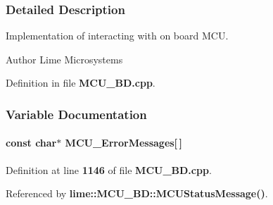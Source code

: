 \subsubsection{Detailed Description}
Implementation of interacting with on board M\+CU. 

\begin{DoxyAuthor}{Author}
Lime Microsystems 
\end{DoxyAuthor}


Definition in file {\bf M\+C\+U\+\_\+\+B\+D.\+cpp}.



\subsubsection{Variable Documentation}
\paragraph[{M\+C\+U\+\_\+\+Error\+Messages}]{\setlength{\rightskip}{0pt plus 5cm}const char$\ast$ M\+C\+U\+\_\+\+Error\+Messages[$\,$]\hspace{0.3cm}{\ttfamily [static]}}\label{MCU__BD_8cpp_abc2832ceda9b9cd5308ebacad0921913}


Definition at line {\bf 1146} of file {\bf M\+C\+U\+\_\+\+B\+D.\+cpp}.



Referenced by {\bf lime\+::\+M\+C\+U\+\_\+\+B\+D\+::\+M\+C\+U\+Status\+Message()}.


